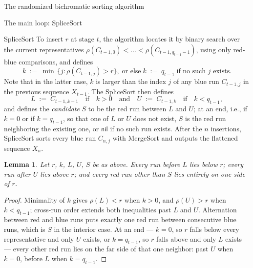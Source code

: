 \documentclass[11pt]{article}
\newcommand{\nil}{\textsf{nil}}
\newtheorem{lem}[thm]{Lemma}
\theoremstyle{definition}
\numberwithin{equation}{section}
\begin{document}
\begin{section}{The randomized bichromatic sorting algorithm}
\begin{subsection}{The main loop: {\ttfamily SpliceSort}}
\begin{aiblock}{\ttfamily SpliceSort}
To insert $r$ at stage $t$, the algorithm locates it by binary search
over the current representatives
$\rho(C_{t-1,0}) < \dots < \rho(C_{t-1,q_{t-1}-1})$,
using only red-blue comparisons, and defines
$$
k\;:=\;\min\,\{j : \rho(C_{t-1,j}) > r\},
\;\text{or else}\; k\;:=\;q_{t-1}\;\text{if no such $j$ exists.}
$$
Note that in the latter case, $k$ is larger than the index $j$ of any blue run $C_{t-1,j}$ in the previous sequence $X_{t-1}$. The {\ttfamily SpliceSort} then defines
$$
L\;:=\;C_{t-1,k-1}\quad\text{if}\quad k > 0\quad\text{and}\quad U\;:=\;C_{t-1,k}\quad\text{if}\quad k < q_{t-1},
$$
and defines the {\em candidate} $S$ to be the red run between $L$
and $U$; at an end, i.e., if $k = 0$ or if $k = q_{t-1}$, so that one of $L$ or $U$ does not exist, $S$ is the red run neighboring the existing one, or $\nil$ if no such run exists. After the $n$ insertions, {\ttfamily SpliceSort} sorts every blue run $C_{n,j}$ with {\ttfamily MergeSort} and outputs the flattened sequence $X_n$.

\begin{lem}\label{lem:location}
Let $r$, $k$, $L$, $U$, $S$ be as above. Every run before $L$
lies below $r$; every run after $U$ lies above $r$; and every red
run other than $S$ lies entirely on one side of $r$.
\end{lem}
\begin{proof}
Minimality of $k$ gives $\rho(L) < r$ when $k > 0$, and
$\rho(U) > r$ when $k < q_{t-1}$; cross-run order extends both
inequalities past $L$ and $U$. Alternation between red and blue runs puts exactly one red run between consecutive blue runs, which is $S$ in the interior
case. At an end --- $k = 0$, so $r$ falls below every
representative and only $U$ exists, or $k = q_{t-1}$, so $r$ falls
above and only $L$ exists --- every other red run lies on the far
side of that one neighbor: past $U$ when $k = 0$, before $L$ when
$k = q_{t-1}$.
\end{proof}
\end{aiblock}


\end{subsection}


\end{section}
\end{document}

